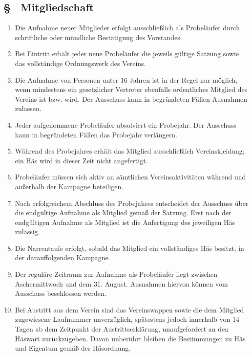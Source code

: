 \subsection{§ \thegoparagraphcounter\ Mitgliedschaft} \label{go:par:mitgliedschaft}
\begin{enumerate}
    \item \label{go:abs:2o7f6t} Die Aufnahme neuer Mitglieder erfolgt ausschließlich als Probeläufer durch schriftliche oder mündliche Bestätigung des Vorstandes.

    \item \label{go:abs:e6pthy} Bei Eintritt erhält jeder neue Probeläufer die jeweils gültige Satzung sowie das vollständige Ordnungswerk des Vereins.

    \item \label{go:abs:h8muwn} Die Aufnahme von Personen unter 16 Jahren ist in der Regel nur möglich, wenn mindestens ein gesetzlicher Vertreter ebenfalls ordentliches Mitglied des Vereins ist bzw. wird. Der Ausschuss kann in begründeten Fällen Ausnahmen zulassen.

    \item \label{go:abs:daoe1b} Jeder aufgenommene Probeläufer absolviert ein Probejahr. Der Ausschuss kann in begründeten Fällen das Probejahr verlängern.

    \item \label{go:abs:cs55q5} Während des Probejahres erhält das Mitglied ausschließlich Vereinskleidung; ein Häs wird in dieser Zeit nicht angefertigt.

    \item \label{go:abs:4t9fyx} Probeläufer müssen sich aktiv an sämtlichen Vereinsaktivitäten während und außerhalb der Kampagne beteiligen.

    \item \label{go:abs:uvjuiz} Nach erfolgreichem Abschluss des Probejahres entscheidet der Ausschuss über die endgültige Aufnahme als Mitglied gemäß  der Satzung. Erst nach der endgültigen Aufnahme als Mitglied ist die Anfertigung des jeweiligen Häs zulässig.

    \item \label{go:abs:pd9q04} Die Narrentaufe erfolgt, sobald das Mitglied ein vollständiges Häs besitzt, in der darauffolgenden Kampagne.

    \item \label{go:abs:qbkq7j} Der reguläre Zeitraum zur Aufnahme als Probeläufer liegt zwischen Aschermittwoch und dem 31. August. Ausnahmen hiervon können vom Ausschuss beschlossen werden.

    \item \label{go:abs:0fzfll} Bei Austritt aus dem Verein sind das Vereinswappen sowie die dem Mitglied zugewiesene Laufnummer unverzüglich, spätestens jedoch innerhalb von 14 Tagen ab dem Zeitpunkt der Austrittserklärung, unaufgefordert an den Häswart zurückzugeben. Davon unberührt bleiben die Bestimmungen zu Häs und Eigentum gemäß der Häsordnung.
\end{enumerate}

